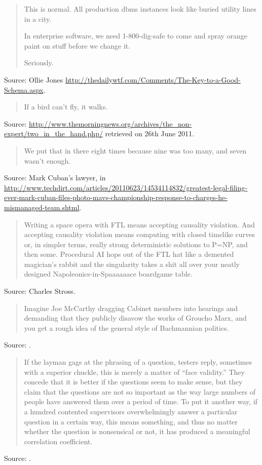 \documentclass[a4paper]{article}
\begin{document}
\begin{quote}
	This is normal. All production dbms instances look like buried utility lines in a city.

	In enterprise software, we need 1-800-dig-safe to come and spray orange paint on stuff before
	we change it.

	Seriously. 
\end{quote}
Source: Ollie Jones \url{http://thedailywtf.com/Comments/The-Key-to-a-Good-Schema.aspx}.
\medskip

\begin{quote}
	If a bird can't fly, it walks.
\end{quote}
Source: \url{http://www.themorningnews.org/archives/the_non-expert/two_in_the_hand.php/} retrieved
on 26th June 2011.
\medskip

\begin{quote}
	We put that in there eight times because nine was too many, and seven wasn't enough.
\end{quote}
Source: Mark Cuban's lawyer, in \url{http://www.techdirt.com/articles/20110623/14534114832/greatest-legal-filing-ever-mark-cuban-files-photo-mavs-championship-response-to-charges-he-mismanaged-team.shtml}.
\medskip

\begin{quote}
	Writing a space opera with FTL means accepting causality violation. And accepting causality
violation means computing with closed timelike curves or, in simpler terms, really strong
deterministic solutions to P=NP, and then some. Procedural AI hops out of the FTL hat like a
demented magician's rabbit and the singularity takes a shit all over your neatly designed
Napoleonics-in-Spaaaaaace boardgame table.
\end{quote}
Source: Charles Stross.
\medskip

\begin{quote}
	Imagine Joe McCarthy dragging Cabinet members into hearings and demanding that they publicly
disavow the works of Groucho Marx, and you get a rough idea of the general style of Bachmannian
politics.
\end{quote}
Source: \citet{Taibbi2011}.
\medskip

\begin{quote}
	If the layman gags at the phrasing of a question, testers reply, sometimes with a superior
chuckle, this is merely a matter of ``face validity.''  They concede that it is better if the
questions seem to make sense, but they claim that the questions are not so important as the way
large numbers of people have answered them over a period of time.  To put it another way, if a
hundred contented supervisors overwhelmingly answer a particular question in a certain way, this
means something, and thus no matter whether the question is nonsensical or not, it has produced a
meaningful correlation coefficient.
\end{quote}
Source: \citet[Chapter 15]{Whyte1956}.
\medskip
\end{document}
